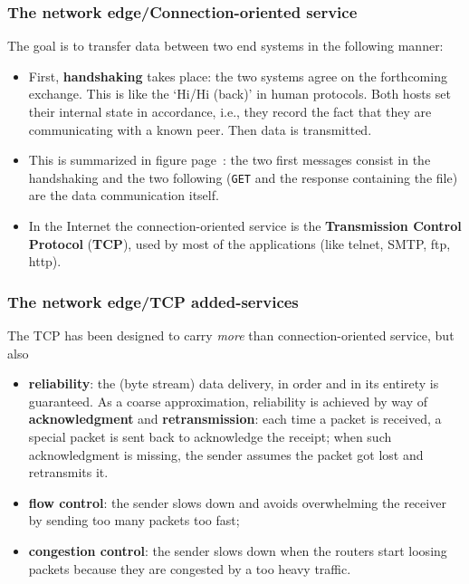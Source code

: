 %
\begin{frame}
\frametitle{The network edge/Connection-oriented service}

The goal is to transfer data between two end systems in the following
manner:

\begin{itemize}

  \item First, \textbf{handshaking} takes place: the two systems
  agree on the forthcoming exchange. This is like the `Hi/Hi (back)'
  in human protocols. Both hosts set their internal state in
  accordance, i.e., they record the fact that they are communicating
  with a known peer. Then data is transmitted.

  \item This is summarized in figure page~\pageref{protocols}: the
  two first messages consist in the handshaking and the two following
  (\texttt{GET} and the response containing the file) are the data
  communication itself.

  \item In the Internet the connection-oriented service is the
  \textbf{Transmission Control Protocol} (\textbf{TCP}), used by most
  of the applications (like telnet, SMTP, ftp, http).

\end{itemize}

\end{frame}

%
\begin{frame}
\frametitle{The network edge/TCP added-services}

The TCP has been designed to carry \emph{more} than
connection-oriented service, but also
\begin{itemize}

  \item \textbf{reliability}: the (byte stream) data delivery, in
  order and in its entirety is guaranteed. As a coarse approximation,
  reliability is achieved by way of \textbf{acknowledgment} and
  \textbf{retransmission}: each time a packet is received, a special
  packet is sent back to acknowledge the receipt; when such
  acknowledgment is missing, the sender assumes the packet got lost
  and retransmits it.

  \item \textbf{flow control}: the sender slows down and avoids
  overwhelming the receiver by sending too many packets too fast;


  \item \textbf{congestion control}: the sender slows down when the
  routers start loosing packets because they are congested by a too
  heavy traffic.

\end{itemize}

\end{frame}

